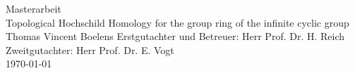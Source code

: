 \documentclass[8pt, twoside]{report}
\theoremstyle{definition}
\begin{document}
\begin{titlepage}
\begin{center}
	\vspace*{1cm}
	\large
	Masterarbeit\\
	\vspace{1cm}
	\huge
		Topological Hochschild Homology for the group ring of the infinite cyclic group\\
	\vspace{1.5cm}
	\large
	Thomas Vincent Boelens
	\vfill
	Erstgutachter und Betreuer: Herr Prof. Dr. H. Reich\\
	Zweitgutachter: Herr Prof. Dr. E. Vogt\\
	\vspace{1cm}
	\today	
	\end{center}
\end{titlepage}
\tableofcontents





\printbibliography
\end{document}
